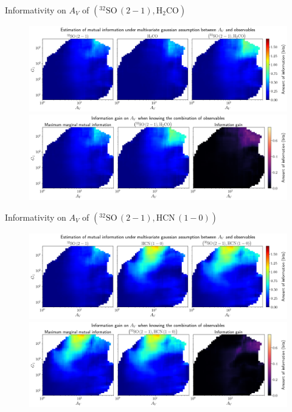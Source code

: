 \documentclass{beamer}
\begin{document}
\begin{frame}{Informativity on $A_V$ of $\left(\mathrm{^{32}SO\,(2-1)},\mathrm{H_2CO}\right)$}
    \begin{figure}
        \centering
        \includegraphics[width=0.95\linewidth]{../linearinfogauss/av__32so21_h2co_linearinfogauss.png}
        \vfill
        \includegraphics[width=0.95\linewidth]{../linearinfogauss/av__32so21_h2co_linearinfogauss_gain.png}
    \end{figure}
\end{frame}

\begin{frame}{Informativity on $A_V$ of $\left(\mathrm{^{32}SO\,(2-1)},\mathrm{HCN\,(1-0)}\right)$}
    \begin{figure}
        \centering
        \includegraphics[width=0.95\linewidth]{../linearinfogauss/av__32so21_hcn10_linearinfogauss.png}
        \vfill
        \includegraphics[width=0.95\linewidth]{../linearinfogauss/av__32so21_hcn10_linearinfogauss_gain.png}
    \end{figure}
\end{frame}
\end{document}
